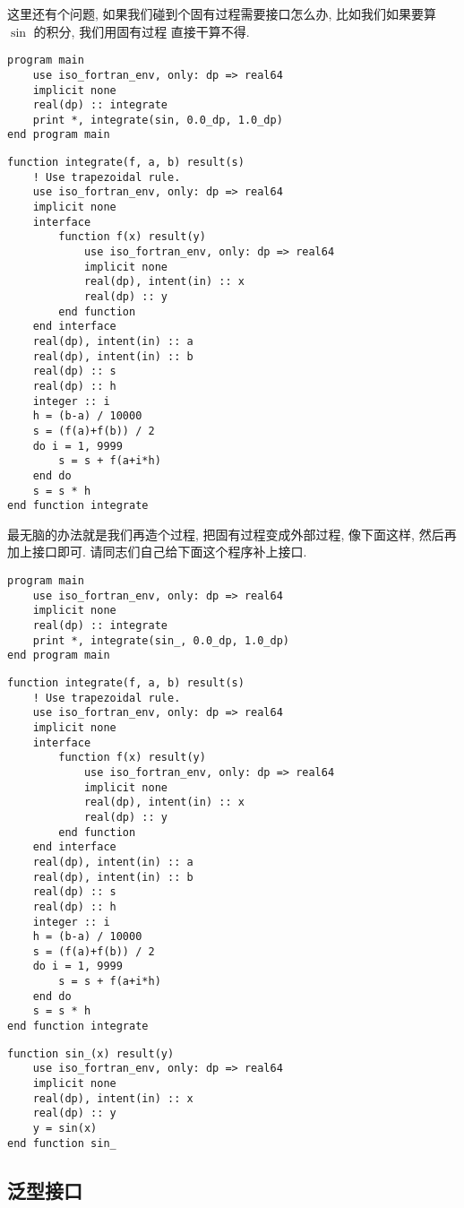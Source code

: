 这里还有个问题, 如果我们碰到个固有过程需要接口怎么办, 比如我们如果要算 $ \sin $ 的积分, 我们用固有过程  直接干算不得.
\begin{lstlisting} 
program main
    use iso_fortran_env, only: dp => real64
    implicit none
    real(dp) :: integrate
    print *, integrate(sin, 0.0_dp, 1.0_dp)
end program main
\end{lstlisting}
\begin{lstlisting}
function integrate(f, a, b) result(s)
    ! Use trapezoidal rule.
    use iso_fortran_env, only: dp => real64
    implicit none
    interface
        function f(x) result(y)
            use iso_fortran_env, only: dp => real64
            implicit none
            real(dp), intent(in) :: x
            real(dp) :: y
        end function
    end interface
    real(dp), intent(in) :: a
    real(dp), intent(in) :: b
    real(dp) :: s
    real(dp) :: h
    integer :: i
    h = (b-a) / 10000
    s = (f(a)+f(b)) / 2
    do i = 1, 9999
        s = s + f(a+i*h)
    end do
    s = s * h
end function integrate
\end{lstlisting} 
最无脑的办法就是我们再造个过程, 把固有过程变成外部过程, 像下面这样, 然后再加上接口即可. 请同志们自己给下面这个程序补上接口. 
\begin{lstlisting} 
program main
    use iso_fortran_env, only: dp => real64
    implicit none
    real(dp) :: integrate
    print *, integrate(sin_, 0.0_dp, 1.0_dp)
end program main
\end{lstlisting}
\begin{lstlisting}
function integrate(f, a, b) result(s)
    ! Use trapezoidal rule.
    use iso_fortran_env, only: dp => real64
    implicit none
    interface
        function f(x) result(y)
            use iso_fortran_env, only: dp => real64
            implicit none
            real(dp), intent(in) :: x
            real(dp) :: y
        end function
    end interface
    real(dp), intent(in) :: a
    real(dp), intent(in) :: b
    real(dp) :: s
    real(dp) :: h
    integer :: i
    h = (b-a) / 10000
    s = (f(a)+f(b)) / 2
    do i = 1, 9999
        s = s + f(a+i*h)
    end do
    s = s * h
end function integrate
\end{lstlisting}
\begin{lstlisting}
function sin_(x) result(y)
    use iso_fortran_env, only: dp => real64
    implicit none
    real(dp), intent(in) :: x
    real(dp) :: y
    y = sin(x)
end function sin_
\end{lstlisting} 

\subsection{泛型接口} 

